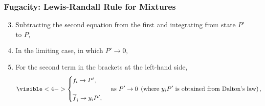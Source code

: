 \documentclass[10pt,compress,handout,ignorenonframetext,unknownkeysallowed]{beamer}
\begin{document}
\begin{frame}
  \frametitle{Fugacity: Lewis-Randall Rule for Mixtures}
        \begin{enumerate}\setcounter{enumi}{2}  
           \item<1-> Subtracting the second equation from the first and integrating from state $P'$ to $P$, 

           \item<3-> In the limiting case, in which $P'\rightarrow 0$,

           \item<4-> For the second term in the brackets at the left-hand side,
                 \begin{displaymath}
                    \visible<4->{\begin{cases}
                       f_{i} \rightarrow P', & \\
                                     & \\
                       \overline{f}_{i} \rightarrow y_{i}P', &
                    \end{cases}}
                    \text{ as } P'\rightarrow 0  \hspace{0.1cm}\left(\text{where } y_{i}P' \text{ is obtained from Dalton's law}\right),
                 \end{displaymath}
               
        \end{enumerate}
\end{frame}
\normalsize 
\end{document}
